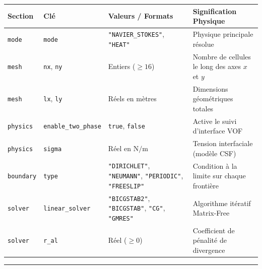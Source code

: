 \documentclass[
  french,
]{article}
\newcounter{none} %
\begin{document}
{\def\LTcaptype{none} %
\begin{longtable}[]{@{}
  >{\raggedright\arraybackslash}p{}
  >{\raggedright\arraybackslash}p{}
  >{\raggedright\arraybackslash}p{}
  >{\raggedright\arraybackslash}p{}@{}}
\toprule\noalign{}
\begin{minipage}[b]{\linewidth}\raggedright
Section
\end{minipage} & \begin{minipage}[b]{\linewidth}\raggedright
Clé
\end{minipage} & \begin{minipage}[b]{\linewidth}\raggedright
Valeurs / Formats
\end{minipage} & \begin{minipage}[b]{\linewidth}\raggedright
Signification Physique
\end{minipage} \\
\midrule\noalign{}
\endhead
\bottomrule\noalign{}
\endlastfoot
\texttt{mode} & \texttt{mode} & \texttt{"NAVIER\_STOKES"},
\texttt{"HEAT"} & Physique principale résolue \\
\texttt{mesh} & \texttt{nx}, \texttt{ny} & Entiers (\(\ge 16\)) & Nombre
de cellules le long des axes \(x\) et \(y\) \\
\texttt{mesh} & \texttt{lx}, \texttt{ly} & Réels en mètres & Dimensions
géométriques totales \\
\texttt{physics} & \texttt{enable\_two\_phase} & \texttt{true},
\texttt{false} & Active le suivi d'interface VOF \\
\texttt{physics} & \texttt{sigma} & Réel en \(\text{N/m}\) & Tension
interfaciale (modèle CSF) \\
\texttt{boundary} & \texttt{type} & \texttt{"DIRICHLET"},
\texttt{"NEUMANN"}, \texttt{"PERIODIC"}, \texttt{"FREESLIP"} & Condition
à la limite sur chaque frontière \\
\texttt{solver} & \texttt{linear\_solver} & \texttt{"BICGSTAB2"},
\texttt{"BICGSTAB"}, \texttt{"CG"}, \texttt{"GMRES"} & Algorithme
itératif Matrix-Free \\
\texttt{solver} & \texttt{r\_al} & Réel (\(\ge 0\)) & Coefficient de
pénalité de divergence \\
\end{longtable}
}

\begin{center}\rule{0.5\linewidth}{0.5pt}\end{center}
\end{document}
